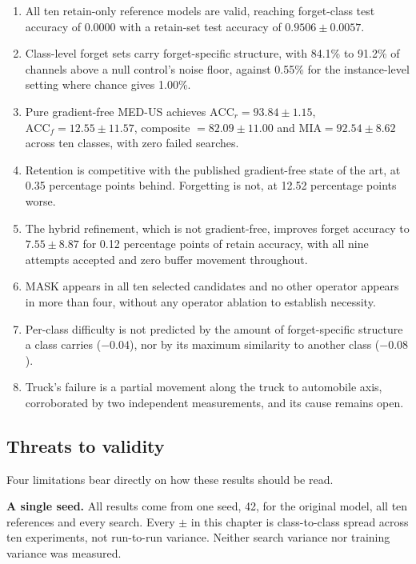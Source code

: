 \begin{enumerate}
  \item All ten retain-only reference models are valid, reaching forget-class test
    accuracy of 0.0000 with a retain-set test accuracy of $0.9506 \pm 0.0057$.
  \item Class-level forget sets carry forget-specific structure, with 84.1\% to
    91.2\% of channels above a null control's noise floor, against 0.55\% for the
    instance-level setting where chance gives 1.00\%.
  \item Pure gradient-free MED-US achieves $\mathrm{ACC}_r = 93.84 \pm 1.15$,
    $\mathrm{ACC}_f = 12.55 \pm 11.57$, composite $= 82.09 \pm 11.00$ and
    $\mathrm{MIA} = 92.54 \pm 8.62$ across ten classes, with zero failed searches.
  \item Retention is competitive with the published gradient-free state of the
    art, at 0.35 percentage points behind. Forgetting is not, at 12.52 percentage
    points worse.
  \item The hybrid refinement, which is not gradient-free, improves forget
    accuracy to $7.55 \pm 8.87$ for 0.12 percentage points of retain accuracy,
    with all nine attempts accepted and zero buffer movement throughout.
  \item MASK appears in all ten selected candidates and no other operator appears
    in more than four, without any operator ablation to establish necessity.
  \item Per-class difficulty is not predicted by the amount of forget-specific
    structure a class carries ($-0.04$), nor by its maximum similarity to another
    class ($-0.08$).
  \item Truck's failure is a partial movement along the truck to automobile axis,
    corroborated by two independent measurements, and its cause remains open.
\end{enumerate}

\subsection{Threats to validity}
\label{sec:exp-threats-forward}

Four limitations bear directly on how these results should be read.

\textbf{A single seed.} All results come from one seed, 42, for the original
model, all ten references and every search. Every $\pm$ in this chapter is
class-to-class spread across ten experiments, not run-to-run variance. Neither
search variance nor training variance was measured.

